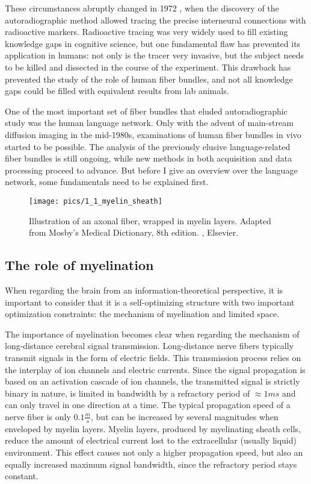 These circumstances abruptly changed in 1972 \cite{1.1.history}, when the discovery of the autoradiographic method allowed tracing the precise interneural connections with radioactive markers.
Radioactive tracing was very widely used to fill existing knowledge gaps in cognitive science, but one fundamental flaw has prevented its application in humans: not only is the tracer very invasive, but the subject needs to be killed and dissected in the course of the experiment.
This drawback has prevented the study of the role of human fiber bundles, and not all knowledge gaps could be filled with equivalent results from lab animals.

One of the most important set of fiber bundles that eluded autoradiographic study was the human language network.
Only with the advent of main-stream diffusion imaging \cite{1.1.firstDiffusion} in the mid-1980s, examinations of human fiber bundles in vivo started to be possible.
The analysis of the previously elusive language-related fiber bundles is still ongoing, while new methods in both acquisition and data processing proceed to advance.
But before I give an overview over the language network, some fundamentals need to be explained first.

\begin{figure}[h]
\begin{center}
\vspace{7mm}
\texttt{[image: pics/1\_1\_myelin\_sheath]}
\caption{\label{1.1.neuron.illustrated} Illustration of an axonal fiber, wrapped in myelin layers. Adapted from Mosby's Medical Dictionary, 8th edition. , Elsevier.}
\end{center}
\end{figure}

\subsection{The role of myelination}\label{1.1.myelin}
When regarding the brain from an information-theoretical perspective, it is important to consider that it is a self-optimizing structure with two important optimization constraints: the mechanism of myelination and limited space.

The importance of myelination becomes clear when regarding the mechanism of long-distance cerebral signal transmission.
Long-distance nerve fibers typically transmit signals in the form of electric fields.
This transmission process relies on the interplay of ion channels and electric currents.
Since the signal propagation is based on an activation cascade of ion channels, the transmitted signal is strictly binary in nature, is limited in bandwidth by a refractory period of $\approx 1ms$ and can only travel in one direction at a time.
The typical propagation speed of a nerve fiber is only $0.1\frac{m}{s}$, but can be increased by several magnitudes when enveloped by myelin layers.
Myelin layers, produced by myelinating sheath cells, reduce the amount of electrical current lost to the extracellular (usually liquid) environment.
This effect causes not only a higher propagation speed, but also an equally increased maximum signal bandwidth, since the refractory period stays constant.

